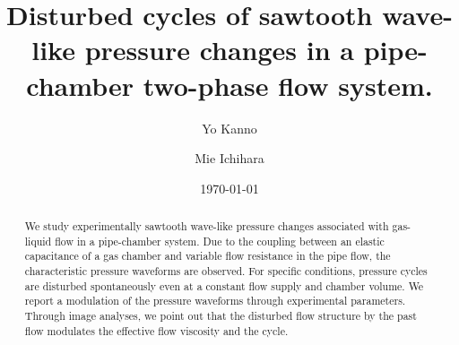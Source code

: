 \documentclass[aps,pre,preprint,groupedaddress,showkeys]{revtex4-2}
\begin{document}

\title{Disturbed cycles of sawtooth wave-like pressure changes in a pipe-chamber two-phase flow system.}


\author{Yo Kanno}

\author{Mie Ichihara}



\date{\today}
\begin{abstract}
We study experimentally sawtooth wave-like pressure changes associated with gas-liquid flow in a pipe-chamber system.
Due to the coupling between an elastic capacitance of a gas chamber and variable flow resistance in the pipe flow, the characteristic pressure waveforms are observed.
For specific conditions, pressure cycles are disturbed spontaneously even at a constant flow supply and chamber volume.
We report a modulation of the pressure waveforms through experimental parameters.  
Through image analyses, we point out that the disturbed flow structure by the past flow modulates the effective flow viscosity and the cycle.
\end{abstract}
\end{document}
